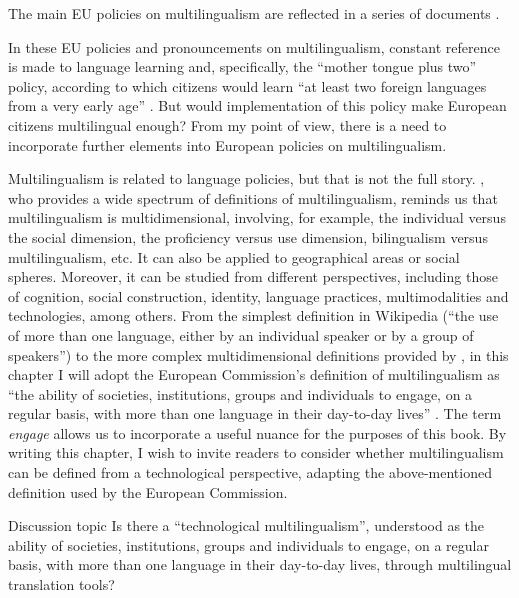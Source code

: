 \documentclass[output=paper]{langscibook}
\begin{document}
The main EU policies on multilingualism are reflected in a series of documents  \citep{EuropeanCouncil2002, EuropeanCommission2008, CounciloftheEU2008may, CounciloftheEU2008dec, CounciloftheEU2011, CounciloftheEU2014, EuropeanCouncil2017}.


In these EU policies and pronouncements on multilingualism, constant reference is made to language learning and, specifically, the “mother tongue plus two” policy, according to which citizens would learn “at least two foreign languages from a very early age” \citep{EuropeanCouncil2002}.  But would implementation of this policy make European citizens multilingual enough? From my point of view, there is a need to incorporate further elements into European policies on multilingualism.

Multilingualism is related to language policies, but that is not the full story. \citet{Cenoz2013}, who provides a wide spectrum of definitions of multilingualism, reminds us that multilingualism is multidimensional, involving, for example, the individual versus the social dimension, the proficiency versus use dimension, bilingualism versus multilingualism, etc. It can also be applied to geographical areas or social spheres. Moreover, it can be studied from different perspectives, including those of cognition, social construction, identity, language practices, multimodalities and technologies, among others. From the simplest definition in Wikipedia (“the use of more than one language, either by an individual speaker or by a group of speakers”) to the more complex multidimensional definitions provided by \citet{Cenoz2013}, in this chapter I will adopt the European Commission’s definition of multilingualism as “the ability of societies, institutions, groups and individuals to engage, on a regular basis, with more than one language in their day-to-day lives” \citep{EuropeanCommission2007}. The term \textit{engage} allows us to incorporate a useful nuance for the purposes of this book. By writing this chapter, I wish to invite readers to consider whether multilingualism can be defined from a technological perspective, adapting the above-mentioned definition used by the European Commission.

\begin{tblsframed}{Discussion topic}
Is there a “technological multilingualism”, understood as the ability of societies, institutions, groups and individuals to engage, on a regular basis, with more than one language in their day-to-day lives, through multilingual translation tools?
\end{tblsframed}
\end{document}

